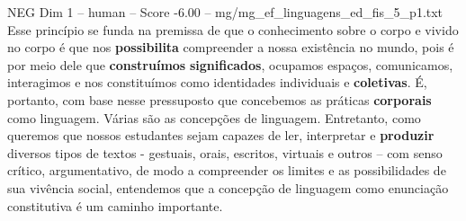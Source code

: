 \begin{textsample}{NEG Dim 1 – human – Score -6.00 – mg/mg\_ef\_linguagens\_ed\_fis\_5\_p1.txt}  \label{ex:f1_neg_007}
Esse princípio se funda na premissa de que o conhecimento sobre o corpo e vivido no corpo é que nos \textbf{possibilita} compreender a nossa existência no mundo, pois é por meio dele que \textbf{construímos} \textbf{significados}, ocupamos espaços, comunicamos, interagimos e nos constituímos como identidades individuais e \textbf{coletivas}. É, portanto, com base nesse pressuposto que concebemos as práticas \textbf{corporais} como linguagem.
Várias são as concepções de linguagem.
Entretanto, como queremos que nossos estudantes sejam capazes de ler, interpretar e \textbf{produzir} diversos tipos de textos - gestuais, orais, escritos, virtuais e outros – com senso crítico, argumentativo, de modo a compreender os limites e as possibilidades de sua vivência social, entendemos que a concepção de linguagem como enunciação constitutiva é um caminho importante.

\end{textsample}
